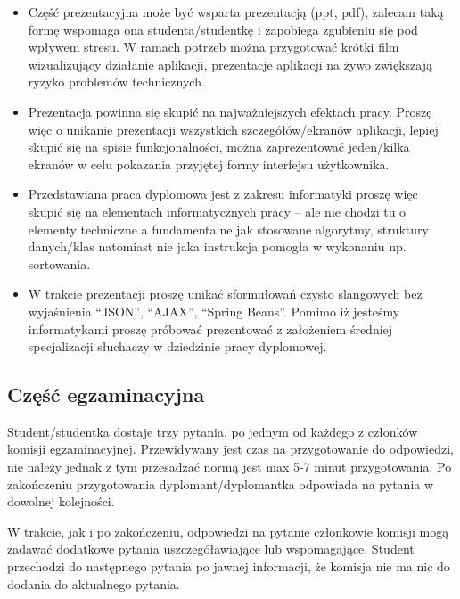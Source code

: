 \documentclass[12pt,a4paper]{article}
\begin{document}
\begin{itemize}
\item Część prezentacyjna może być wsparta prezentacją (ppt, pdf), zalecam taką formę wspomaga ona studenta/studentkę i zapobiega zgubieniu się pod wpływem stresu. W ramach potrzeb można przygotować krótki film wizualizujący działanie aplikacji, prezentacje aplikacji na żywo zwiększają ryzyko problemów technicznych.

\item Prezentacja powinna się skupić na najważniejszych efektach pracy. Proszę więc o unikanie prezentacji wszystkich szczegółów/ekranów aplikacji, lepiej skupić się na spisie funkcjonalności, można zaprezentować jeden/kilka ekranów w celu pokazania przyjętej formy interfejsu użytkownika.

\item Przedstawiana praca dyplomowa jest z zakresu informatyki proszę więc skupić się na elementach informatycznych pracy -- ale nie chodzi tu o elementy techniczne a fundamentalne jak stosowane algorytmy, struktury danych/klas natomiast nie jaka instrukcja pomogła w wykonaniu np. sortowania.

\item W trakcie prezentacji proszę unikać sformułowań czysto slangowych bez wyjaśnienia ``JSON'', ``AJAX'', ``Spring Beans''. Pomimo iż jesteśmy informatykami proszę próbować prezentować z założeniem średniej specjalizacji słuchaczy w dziedzinie pracy dyplomowej.
\end{itemize}

\subsection{Część egzaminacyjna}

Student/studentka dostaje trzy pytania, po jednym od każdego z członków komisji egzaminacyjnej. Przewidywany jest czas na przygotowanie do odpowiedzi, nie należy jednak z tym przesadzać normą jest max 5-7 minut przygotowania. Po zakończeniu przygotowania dyplomant/dyplomantka odpowiada na pytania w dowolnej kolejności. 

W trakcie, jak i po zakończeniu, odpowiedzi na pytanie członkowie komisji mogą zadawać dodatkowe pytania uszczegóławiające lub wspomagające. Student przechodzi do następnego pytania po jawnej informacji, że komisja nie ma nic do dodania do aktualnego pytania.






\end{document}
